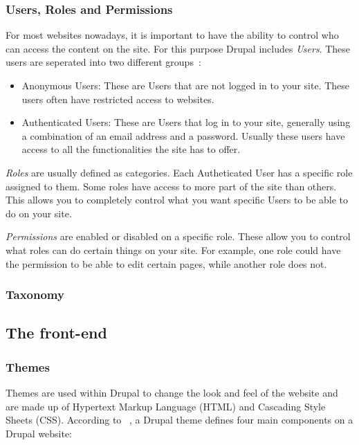 \subsubsection{Users, Roles and Permissions}

For most websites nowadays, it is important to have the ability to control who can access the content on the site. For this purpose Drupal includes \emph{Users}. These users are seperated into two different groups~\autocite{Tomlinson2015}:
\begin{itemize}
	\item  Anonymous Users: These are Users that are not logged in to your site. These users often have restricted access to websites.
	\item  Authenticated Users: These are Users that log in to your site, generally using a combination of an email address and a password. Usually these users have access to all the functionalities the site has to offer.
\end{itemize}

\emph{Roles} are usually defined as categories. Each Autheticated User has a specific role assigned to them. Some roles have access to more part of the site than others. This allows you to completely control what you want specific Users to be able to do on your site.

\emph{Permissions} are enabled or disabled on a specific role. These allow you to control what roles can do certain things on your site. For example, one role could have the permission to be able to edit certain pages, while another role does not.

\subsubsection{Taxonomy}


\subsection{The front-end}

\subsubsection{Themes}

Themes are used within Drupal to change the look and feel of the website and are made up of Hypertext Markup Language (HTML) and Cascading Style Sheets (CSS). According to ~\textcite{Tomlinson2015}, a Drupal theme defines four main components on a Drupal website: 

